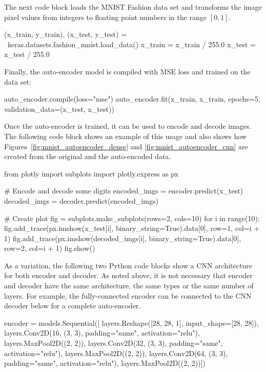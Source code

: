 The next code block loads the MNIST Fashion data set and transforms the image pixel values from integers to floating point numbers in the range $[0,1]$.

\begin{pythoncode}
(x_train, y_train), (x_test, y_test) = \
                    keras.datasets.fashion_mnist.load_data()
x_train = x_train / 255.0
x_test = x_test / 255.0
\end{pythoncode}

Finally, the auto-encoder model is compiled with MSE loss and trained on the data set:

\begin{pythoncode}
auto_encoder.compile(loss="mse")
auto_encoder.fit(x_train, x_train, 
                 epochs=5, validation_data=(x_test, x_test))
\end{pythoncode}

Once the auto-encoder is trained, it can be used to encode and decode images. The following code block shows an example of this usage and also shows how Figures~\ref{fig:mnist_autoencoder_dense} and \ref{fig:mnist_autoencoder_cnn} are created from the original and the auto-encoded data.

\begin{pythoncode}
from plotly import subplots
import plotly.express as px

# Encode and decode some digits
encoded_imgs = encoder.predict(x_test)
decoded_imgs = decoder.predict(encoded_imgs)

# Create plot
fig = subplots.make_subplots(rows=2, cols=10)
for i in range(10):
    fig.add_trace(px.imshow(x_test[i], 
        binary_string=True).data[0], row=1, col=i + 1)
    fig.add_trace(px.imshow(decoded_imgs[i], 
        binary_string=True).data[0], row=2, col=i + 1)
fig.show()
\end{pythoncode}

As a variation, the following two Python code blocks show a CNN architecture for both encoder and decoder. As noted above, it is not necessary that encoder and decoder have the same architecture, the same types or the same number of layers. For example, the fully-connected encoder can be connected to the CNN decoder below for a complete auto-encoder.

\begin{pythoncode}
encoder = models.Sequential([
    layers.Reshape([28, 28, 1], input_shape=[28, 28]),
    layers.Conv2D(16, (3, 3), padding="same", activation="relu"),
    layers.MaxPool2D((2, 2)),
    layers.Conv2D(32, (3, 3), padding="same", activation="relu"),
    layers.MaxPool2D((2, 2)),
    layers.Conv2D(64, (3, 3), padding="same", activation="relu"),
    layers.MaxPool2D((2, 2))])
\end{pythoncode}

